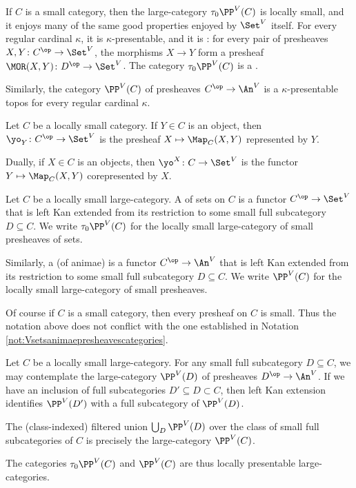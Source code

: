 \begin{nul}
	If $ C $ is a small category, then 
	the large-category $ \tau_0\PP^V(C) $ is locally small,
	and it enjoys many of the same good properties
	enjoyed by $ \Set^V $ itself.
	For every regular cardinal $ \kappa $,
	it is $ \kappa $-presentable,
	and it is :
	for every pair of presheaves $ X, Y \colon C^{\op} \to \Set^V $,
	the morphisms $ X \to Y $
	form a presheaf $ \MOR(X, Y) \colon D^{\op} \to \Set^V $.
	The category $ \tau_0\PP^V(C) $ is a .

	Similarly, the category $ \PP^V(C) $ of presheaves
	$ C^{\op} \to \An^V $
	is a $ \kappa $-presentable topos
	for every regular cardinal $ \kappa $.
\end{nul}

\begin{eg}
	Let $ C $ be a locally small category.
	If $ Y \in C $ is an object,
	then $ \yo_Y \colon C^{\op} \to \Set^V $ is
	the presheaf $ X \mapsto \Map_C(X,Y) $ represented by $ Y $.

	Dually, if $ X \in C $ is an objects,
	then $ \yo^X \colon C \to \Set^V $ is the functor
	$ Y \mapsto \Map_C(X,Y) $ corepresented by $ X $.
\end{eg}

\begin{definition}
	Let $ C $ be a locally small large-category.
	A  of sets on $ C $ is
	a functor $ C^{\op} \to \Set^V $
	that is left Kan extended from its restriction
	to some small full subcategory $ D \subseteq C $.
	We write $ \tau_0\PP^V(C) $
	for the locally small large-category
	of small presheaves of sets.
	
	Similarly, a  (of animae) is
	a functor $ C^{\op} \to \An^V $
	that is left Kan extended from its restriction to
	some small full subcategory $ D \subseteq C $.
	We write $ \PP^V(C) $
	for the locally small large-category
	of small presheaves.
\end{definition}

\begin{eg}
	Of course if $ C $ is a small category, then
	every presheaf on $ C $ is small.
	Thus the notation above does not conflict with the one established in
	Notation \ref{not:Vsetsanimaepresheavescategories}.
\end{eg}

\begin{nul}
	Let $ C $ be a locally small large-category.
	For any small full subcategory $ D \subseteq C $,
	we may contemplate the large-category $ \PP^V(D) $
	of presheaves $ D^{\op} \to \An^V $.
	If we have an inclusion of full subcategories
	$ D' \subseteq D \subset C $, then
	left Kan extension identifies $ \PP^V(D') $ with
	a full subcategory of $ \PP^V(D) $.
	
	The (class-indexed) filtered union
	$ \bigcup_D \PP^V(D) $
	over the class of small full subcategories of $ C $
	is precisely the large-category $ \PP^V(C) $.
	
	The categories $ \tau_0\PP^V(C) $ and $ \PP^V(C) $ are thus
	locally presentable large-categories.
\end{nul}

